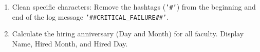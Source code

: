 \documentclass[12pt,a4paper]{article}
\begin{document}
\begin{enumerate}
\item Clean specific characters: Remove the hashtags (\texttt{'\#'}) from the beginning and end of the log message \texttt{'\#\#CRITICAL\_FAILURE\#\#'}.






\item Calculate the hiring anniversary (Day and Month) for all faculty. Display Name, Hired Month, and Hired Day.


\end{enumerate}
\end{document}
